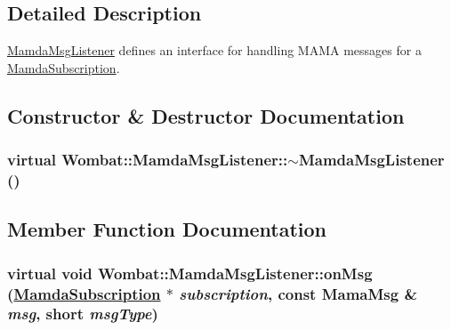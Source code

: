 \subsection{Detailed Description}
\hyperlink{classWombat_1_1MamdaMsgListener}{Mamda\-Msg\-Listener} defines an interface for handling MAMA messages for a \hyperlink{classWombat_1_1MamdaSubscription}{Mamda\-Subscription}. 



\subsection{Constructor \& Destructor Documentation}
\hypertarget{classWombat_1_1MamdaMsgListener_dacd39cbca03cbb38e6a6046a3e6cc43}{
\subsubsection[$\sim$MamdaMsgListener]{\setlength{\rightskip}{0pt plus 5cm}virtual Wombat::Mamda\-Msg\-Listener::$\sim$Mamda\-Msg\-Listener ()}}
\label{classWombat_1_1MamdaMsgListener_dacd39cbca03cbb38e6a6046a3e6cc43}




\subsection{Member Function Documentation}
\hypertarget{classWombat_1_1MamdaMsgListener_c700829ebcce095b95b8b67b39a1c67d}{
\subsubsection[onMsg]{\setlength{\rightskip}{0pt plus 5cm}virtual void Wombat::Mamda\-Msg\-Listener::on\-Msg (\hyperlink{classWombat_1_1MamdaSubscription}{Mamda\-Subscription} $\ast$ {\em subscription}, const Mama\-Msg \& {\em msg}, short {\em msg\-Type})}}
\label{classWombat_1_1MamdaMsgListener_c700829ebcce095b95b8b67b39a1c67d}




